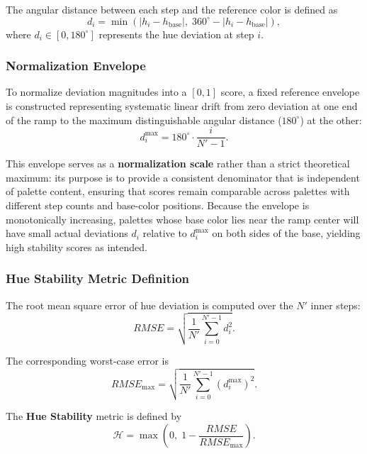 The angular distance between each step and the reference color is defined as
\begin{equation}
d_i =
\min\!\left(
|h_i - h_{\mathrm{base}}|,
\; 360^\circ - |h_i - h_{\mathrm{base}}|
\right),
\end{equation}
where $d_i \in [0, 180^\circ]$ represents the hue deviation at step $i$.

\subsubsection{Normalization Envelope}

To normalize deviation magnitudes into a $[0,1]$ score, a fixed reference
envelope is constructed representing systematic linear drift from zero
deviation at one end of the ramp to the maximum distinguishable angular
distance ($180^\circ$) at the other:
\begin{equation}
d^{\max}_i = 180^\circ \cdot \frac{i}{N' - 1}.
\end{equation}

This envelope serves as a \textbf{normalization scale} rather than a strict
theoretical maximum: its purpose is to provide a consistent denominator that
is independent of palette content, ensuring that scores remain comparable
across palettes with different step counts and base-color positions.
Because the envelope is monotonically increasing, palettes whose base color
lies near the ramp center will have small actual deviations $d_i$ relative
to $d^{\max}_i$ on both sides of the base, yielding high stability scores
as intended.

\subsubsection{Hue Stability Metric Definition}

The root mean square error of hue deviation is computed over the $N'$ inner steps:
\begin{equation}
RMSE =
\sqrt{
\frac{1}{N'}
\sum_{i=0}^{N'-1} d_i^2
}.
\end{equation}

The corresponding worst-case error is
\begin{equation}
RMSE_{\max} =
\sqrt{
\frac{1}{N'}
\sum_{i=0}^{N'-1} \left(d^{\max}_i\right)^2
}.
\end{equation}

The \textbf{Hue Stability} metric is defined by
\begin{equation}
\mathcal{H} =
\max\!\left(
0,\;
1 - \frac{RMSE}{RMSE_{\max}}
\right).
\end{equation}

